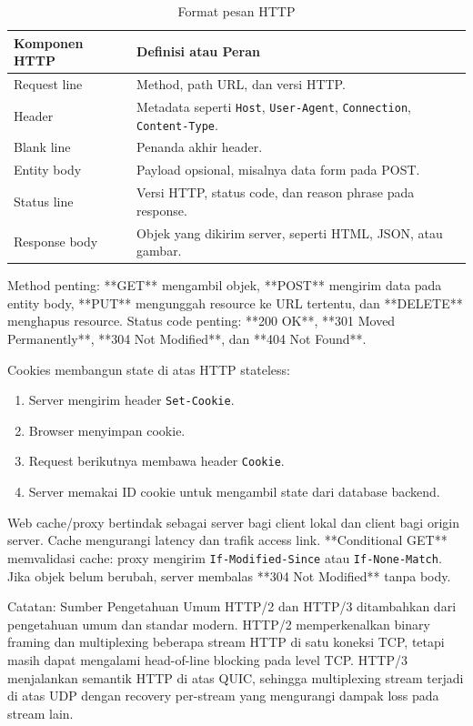 \begin{table}[H]
\centering
\begin{tabularx}{\textwidth}{|L{0.22\textwidth}|X|}
\hline
\textbf{Komponen HTTP} & \textbf{Definisi atau Peran} \\
\hline
Request line & Method, path URL, dan versi HTTP. \\
\hline
Header & Metadata seperti \texttt{Host}, \texttt{User-Agent}, \texttt{Connection}, \texttt{Content-Type}. \\
\hline
Blank line & Penanda akhir header. \\
\hline
Entity body & Payload opsional, misalnya data form pada POST. \\
\hline
Status line & Versi HTTP, status code, dan reason phrase pada response. \\
\hline
Response body & Objek yang dikirim server, seperti HTML, JSON, atau gambar. \\
\hline
\end{tabularx}
\caption{Format pesan HTTP}
\label{tab:http-message}
\end{table}

Method penting: **GET** mengambil objek, **POST** mengirim data pada entity body, **PUT** mengunggah resource ke URL tertentu, dan **DELETE** menghapus resource. Status code penting: **200 OK**, **301 Moved Permanently**, **304 Not Modified**, dan **404 Not Found**.

Cookies membangun state di atas HTTP stateless:
\begin{enumerate}
    \item Server mengirim header \texttt{Set-Cookie}.
    \item Browser menyimpan cookie.
    \item Request berikutnya membawa header \texttt{Cookie}.
    \item Server memakai ID cookie untuk mengambil state dari database backend.
\end{enumerate}

Web cache/proxy bertindak sebagai server bagi client lokal dan client bagi origin server. Cache mengurangi latency dan trafik access link. **Conditional GET** memvalidasi cache: proxy mengirim \texttt{If-Modified-Since} atau \texttt{If-None-Match}. Jika objek belum berubah, server membalas **304 Not Modified** tanpa body.

\begin{cmt}{Catatan: Sumber Pengetahuan Umum}{}
HTTP/2 dan HTTP/3 ditambahkan dari pengetahuan umum dan standar modern. HTTP/2 memperkenalkan binary framing dan multiplexing beberapa stream HTTP di satu koneksi TCP, tetapi masih dapat mengalami head-of-line blocking pada level TCP. HTTP/3 menjalankan semantik HTTP di atas QUIC, sehingga multiplexing stream terjadi di atas UDP dengan recovery per-stream yang mengurangi dampak loss pada stream lain.
\end{cmt}

